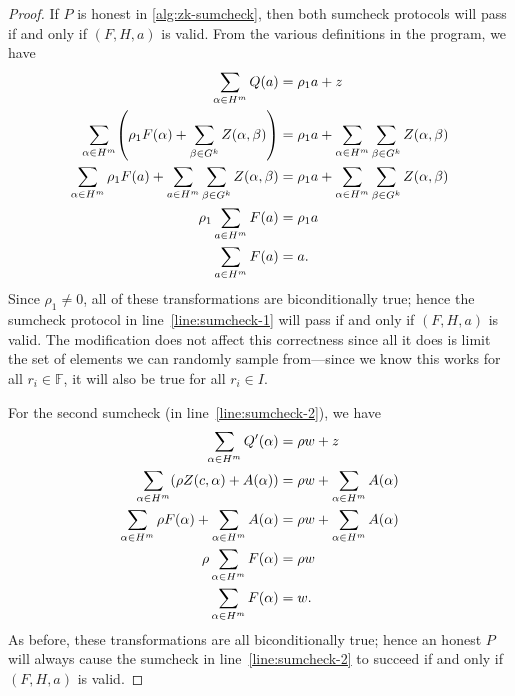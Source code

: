 \documentclass[english,12pt]{reedthesis}
\theoremstyle{plain}
\theoremstyle{definition}
\theoremstyle{remark}
\begin{document}
\begin{proof}
  If $P$ is honest in \cref{alg:zk-sumcheck}, then both sumcheck protocols will
  pass if and only if $(F, H, a)$ is valid. From the various definitions in the
  program, we have
  \begin{align*}
    \sum_{\alpha \in H^{m}}Q(a) &= \rho_{1}a + z \\
    \sum_{\alpha \in H^{m}}\mleft(\rho_{1}F(\alpha) + \sum_{\beta \in G^{k}}Z(\alpha, \beta)\mright) &= \rho_{1}a + \sum_{\alpha \in H^{m}}\sum_{\beta \in G^{k}}Z(\alpha, \beta) \\
    \sum_{\alpha \in H^{m}}\rho_{1}F(a) + \sum_{a \in H^{m}}\sum_{\beta \in G^{k}}Z(\alpha, \beta) &= \rho_{1}a + \sum_{\alpha \in H^{m}}\sum_{\beta \in G^{k}}Z(\alpha, \beta) \\
    \rho_{1}\sum_{a \in H^{m}}F(a) &= \rho_{1}a \\
    \sum_{a \in H^{m}}F(a) &= a.
  \end{align*}
  Since $\rho_{1} \ne 0$, all of these transformations are biconditionally true;
  hence the sumcheck protocol in line~\ref{line:sumcheck-1} will pass if and
  only if $(F, H, a)$ is valid. The modification does not affect this
  correctness since all it does is limit the set of elements we can randomly
  sample from---since we know this works for all $r_{i} \in \mathbb{F}$, it will
  also be true for all $r_{i} \in I$.

  For the second sumcheck (in line~\ref{line:sumcheck-2}), we have
  \begin{align*}
    \sum_{\alpha \in H^{m}}Q'(\alpha) &= \rho w + z \\
    \sum_{\alpha \in H^{m}}\mleft(\rho Z(c, \alpha) + A(\alpha)\mright) &= \rho w + \sum_{\alpha \in H^{m}}A(\alpha) \\
    \sum_{\alpha \in H^{m}}\rho F(\alpha) + \sum_{\alpha \in H^{m}}A(\alpha) &= \rho w + \sum_{\alpha \in H^{m}}A(\alpha) \\
    \rho\sum_{\alpha \in H^{m}}F(\alpha) &= \rho w \\
    \sum_{\alpha \in H^{m}}F(\alpha) &= w.
  \end{align*}
  As before, these transformations are all biconditionally true; hence an honest
  $P$ will always cause the sumcheck in line~\ref{line:sumcheck-2} to succeed if
  and only if $(F, H, a)$ is valid.


\end{proof}
\end{document}
